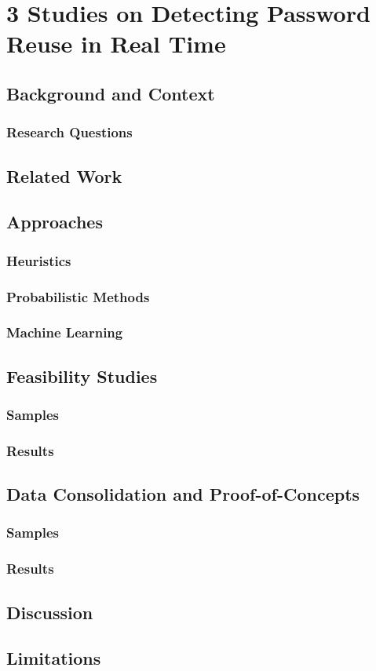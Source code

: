\chapter[3 Studies on Detecting Password Reuse in Real Time]{3 Studies on Detecting Password Reuse in Real Time}

\section{Background and Context}

\subsection{Research Questions}

\section{Related Work}

\section{Approaches}
\subsection{Heuristics}
\subsection{Probabilistic Methods}
\subsection{Machine Learning}


\section{Feasibility Studies}

\subsection{Samples}
\subsection{Results}

\section{Data Consolidation and Proof-of-Concepts}


\subsection{Samples}
\subsection{Results}

\section{Discussion}



\section{Limitations}

